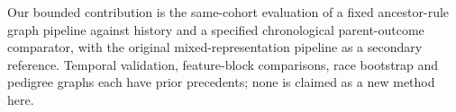 Our bounded contribution is the same-cohort evaluation of a fixed ancestor-rule graph pipeline against history and a specified chronological parent-outcome comparator, with the original mixed-representation pipeline as a secondary reference. Temporal validation, feature-block comparisons, race bootstrap and pedigree graphs each have prior precedents; none is claimed as a new method here.
